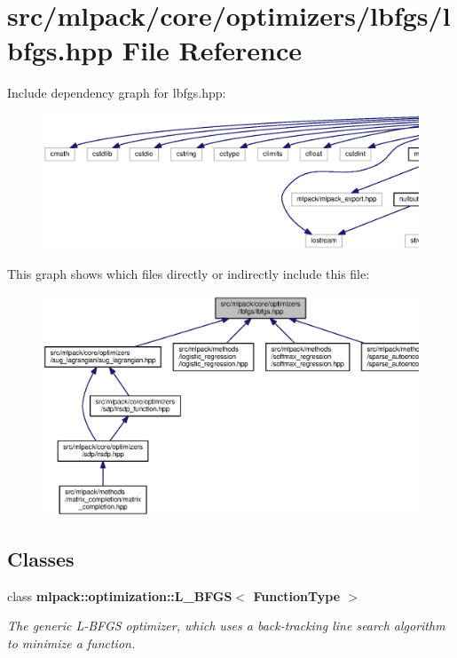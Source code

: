 \section{src/mlpack/core/optimizers/lbfgs/lbfgs.hpp File Reference}
\label{lbfgs_8hpp}
Include dependency graph for lbfgs.\+hpp\+:
\nopagebreak
\begin{figure}[H]
\begin{center}
\leavevmode
\includegraphics[width=350pt]{lbfgs_8hpp__incl}
\end{center}
\end{figure}
This graph shows which files directly or indirectly include this file\+:
\nopagebreak
\begin{figure}[H]
\begin{center}
\leavevmode
\includegraphics[width=350pt]{lbfgs_8hpp__dep__incl}
\end{center}
\end{figure}
\subsection*{Classes}
\begin{DoxyCompactItemize}
\item 
class {\bf mlpack\+::optimization\+::\+L\+\_\+\+B\+F\+G\+S$<$ Function\+Type $>$}
\begin{DoxyCompactList}\small\item\em The generic L-\/\+B\+F\+GS optimizer, which uses a back-\/tracking line search algorithm to minimize a function. \end{DoxyCompactList}\end{DoxyCompactItemize}
